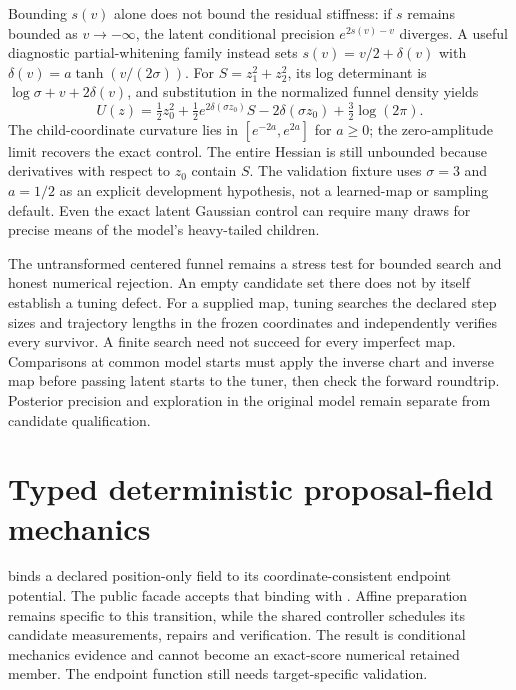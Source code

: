 Bounding $s(v)$ alone does not bound the residual stiffness: if $s$ remains
bounded as $v\to-\infty$, the latent conditional precision
$e^{2s(v)-v}$ diverges. A useful diagnostic partial-whitening family instead
sets $s(v)=v/2+\delta(v)$ with $\delta(v)=a\tanh(v/(2\sigma))$.
For $S=z_1^2+z_2^2$, its log determinant is
$\log\sigma+v+2\delta(v)$, and substitution in the normalized funnel
density yields
\[
 U(z)=\tfrac12 z_0^2+\tfrac12 e^{2\delta(\sigma z_0)}S
       -2\delta(\sigma z_0)+\tfrac32\log(2\pi).
\]
The child-coordinate curvature lies in $[e^{-2a},e^{2a}]$ for $a\geq0$;
the zero-amplitude limit recovers the exact control. The entire Hessian is
still unbounded because derivatives with respect to $z_0$ contain $S$.
The validation fixture uses $\sigma=3$ and $a=1/2$ as an explicit development
hypothesis, not a learned-map or sampling default. Even the exact latent
Gaussian control can require many draws for precise means of the model's
heavy-tailed children.

The untransformed centered funnel remains a stress test for bounded search and
honest numerical rejection. An empty candidate set there does not by itself
establish a tuning defect. For a supplied map, tuning searches the declared
step sizes and trajectory lengths in the frozen coordinates and independently
verifies every survivor. A finite search need not succeed for every imperfect
map. Comparisons at common model starts must apply the inverse chart and
inverse map before passing latent starts to the tuner, then check the forward
roundtrip. Posterior precision and exploration in the original model remain
separate from candidate qualification.



\section{Typed deterministic proposal-field mechanics}

 binds a declared position-only field
to its coordinate-consistent endpoint potential. The public facade accepts
that binding with . Affine preparation
remains specific to this transition, while the shared controller schedules its
candidate measurements, repairs and verification. The result is conditional
mechanics evidence and cannot become an exact-score numerical retained member.
The endpoint function still needs target-specific validation.

